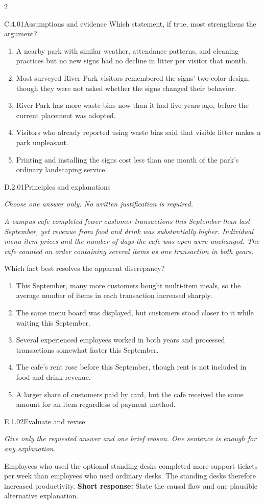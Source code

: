 \documentclass[9pt]{extarticle}
\newcommand{\choice}[1]{\item #1}
\begin{document}
\begin{multicols}{2}
\begin{DenseCoreProblem}{C.4.01}{Assumptions and evidence}
Which statement, if true, most strengthens the argument?
\begin{enumerate}[label=(\alph*)]
  \choice{A nearby park with similar weather, attendance patterns, and cleaning practices but no new signs had no decline in litter per visitor that month.}
  \choice{Most surveyed River Park visitors remembered the signs' two-color design, though they were not asked whether the signs changed their behavior.}
  \choice{River Park has more waste bins now than it had five years ago, before the current placement was adopted.}
  \choice{Visitors who already reported using waste bins said that visible litter makes a park unpleasant.}
  \choice{Printing and installing the signs cost less than one month of the park's ordinary landscaping service.}
\end{enumerate}
\end{DenseCoreProblem}
\begin{DenseCoreProblem}{D.2.01}{Principles and explanations}
{\scriptsize\textit{Choose one answer only. No written justification is required.}\par}
\emph{A campus cafe completed fewer customer transactions this September than last September, yet revenue from food and drink was substantially higher. Individual menu-item prices and the number of days the cafe was open were unchanged. The cafe counted an order containing several items as one transaction in both years.}

Which fact best resolves the apparent discrepancy?
\begin{enumerate}[label=(\alph*)]
  \choice{This September, many more customers bought multi-item meals, so the average number of items in each transaction increased sharply.}
  \choice{The same menu board was displayed, but customers stood closer to it while waiting this September.}
  \choice{Several experienced employees worked in both years and processed transactions somewhat faster this September.}
  \choice{The cafe's rent rose before this September, though rent is not included in food-and-drink revenue.}
  \choice{A larger share of customers paid by card, but the cafe received the same amount for an item regardless of payment method.}
\end{enumerate}
\end{DenseCoreProblem}
\begin{DenseCoreProblem}{E.1.02}{Evaluate and revise}
{\scriptsize\textit{Give only the requested answer and one brief reason. One sentence is enough for any explanation.}\par}
Employees who used the optional standing desks completed more support tickets per week than employees who used ordinary desks. The standing desks therefore increased productivity.
\textbf{Short response:} State the causal flaw and one plausible alternative explanation.
\end{DenseCoreProblem}
\end{multicols}
\end{document}
